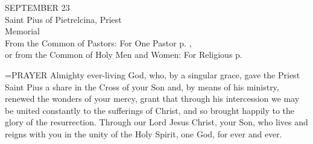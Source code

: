 \begin{center}\normalsize SEPTEMBER 23\\
\footnotesize Saint Pius of Pietrelcina, Priest\\
\footnotesize Memorial\\
\footnotesize From the Common of Pastors: For One Pastor p.   ,\\
\footnotesize or from the Common of Holy Men and Women: For Religious p.\\
\end{center}

\hangindent=\parindent \small{PRAYER 
Almighty ever-living God, who, by a singular grace,
gave the Priest Saint Pius a share in the Cross of your Son
and, by means of his ministry,
renewed the wonders of your mercy,
grant that through his intercession
we may be united constantly to the sufferings of Christ,
and so brought happily to the glory of the resurrection.
Through our Lord Jesus Christ, your Son,
who lives and reigns with you in the unity of the Holy Spirit,
one God, for ever and ever.\\}
 

